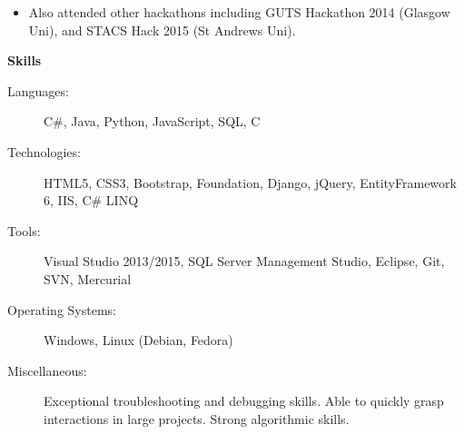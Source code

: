 \documentclass[letterpaper,11pt]{article}
\newcommand{\resheading}[1]{{\large \colorbox{mygrey}{\begin{minipage}{\textwidth}{\textbf{#1 \vphantom{p\^{E}}}}\end{minipage}}}}
\begin{document}
\begin{itemize}
		\item
		\begin{description}
			Also attended other hackathons including GUTS Hackathon 2014 (Glasgow Uni), and STACS Hack 2015 (St Andrews Uni).
		\end{description}

	\end{itemize}

	\resheading{Skills}
	\begin{description}
		\item[Languages:]
		C\#, Java, Python, JavaScript, SQL, C
		\item[Technologies:]
		HTML5, CSS3, Bootstrap, Foundation, Django, jQuery, EntityFramework 6, IIS, C\# LINQ
		\item[Tools:]
		Visual Studio 2013/2015, SQL Server Management Studio, Eclipse, Git, SVN, Mercurial
		\item[Operating Systems:]
		Windows, Linux (Debian, Fedora)
		\item[Miscellaneous:]
		Exceptional troubleshooting and debugging skills. Able to quickly grasp interactions in large projects.
		Strong algorithmic skills.
	\end{description}
\end{document}

